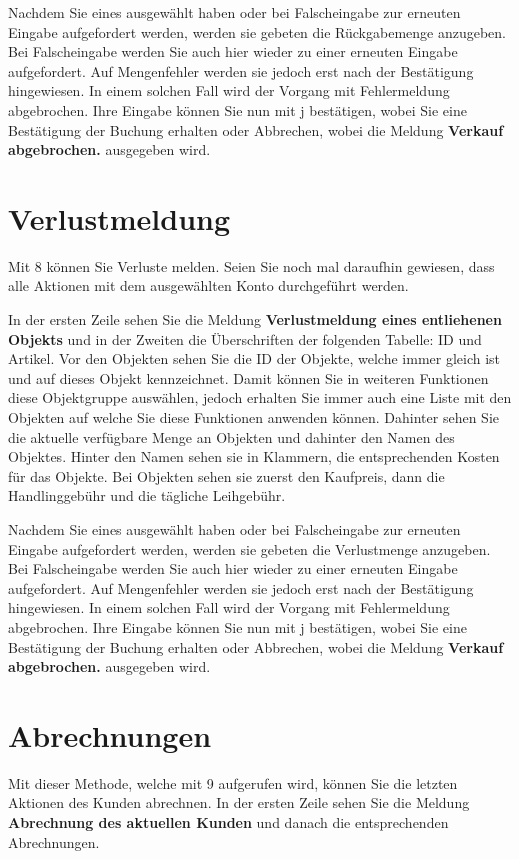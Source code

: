 ﻿\documentclass[a4paper,12pt,titlepage]{article}
\newcommand\enquote[1]{{\ttfamily \bfseries #1}}
\begin{document}
Nachdem Sie eines ausgewählt  haben oder bei Falscheingabe zur erneuten Eingabe aufgefordert werden,
 werden sie gebeten die Rückgabemenge anzugeben.
Bei Falscheingabe werden Sie auch hier wieder zu einer erneuten Eingabe aufgefordert.
Auf Mengenfehler werden sie jedoch erst nach der Bestätigung hingewiesen.
In einem solchen Fall wird der Vorgang mit Fehlermeldung abgebrochen.
Ihre Eingabe können Sie nun mit j bestätigen,
 wobei Sie eine Bestätigung der Buchung erhalten oder Abbrechen,
 wobei die Meldung \enquote{Verkauf abgebrochen.} ausgegeben wird.

\section{Verlustmeldung}
Mit 8 können Sie Verluste melden.
Seien Sie noch mal daraufhin gewiesen, dass alle Aktionen mit dem ausgewählten Konto durchgeführt werden.

In der ersten Zeile sehen Sie die Meldung \enquote{Verlustmeldung eines entliehenen Objekts}
 und in der Zweiten die Überschriften der folgenden Tabelle: ID und Artikel.
Vor den Objekten sehen Sie die ID der Objekte, welche immer gleich ist und auf dieses Objekt kennzeichnet.
Damit können Sie in weiteren Funktionen diese Objektgruppe auswählen,
jedoch erhalten Sie immer auch eine Liste mit den Objekten auf welche Sie diese Funktionen anwenden können.
Dahinter sehen Sie die aktuelle verfügbare Menge an Objekten und dahinter den Namen des Objektes.
Hinter den Namen sehen sie in Klammern, die entsprechenden Kosten für das Objekte.
Bei Objekten sehen sie zuerst den Kaufpreis, dann die Handlinggebühr und die tägliche Leihgebühr.

Nachdem Sie eines ausgewählt  haben oder bei Falscheingabe zur erneuten Eingabe aufgefordert werden,
 werden sie gebeten die Verlustmenge anzugeben.
Bei Falscheingabe werden Sie auch hier wieder zu einer erneuten Eingabe aufgefordert.
Auf Mengenfehler werden sie jedoch erst nach der Bestätigung hingewiesen.
In einem solchen Fall wird der Vorgang mit Fehlermeldung abgebrochen.
Ihre Eingabe können Sie nun mit j bestätigen, wobei Sie eine Bestätigung der Buchung erhalten oder Abbrechen,
 wobei die Meldung \enquote{Verkauf abgebrochen.} ausgegeben wird.

\section{Abrechnungen}
Mit dieser Methode, welche mit 9 aufgerufen wird, können Sie die letzten Aktionen des Kunden abrechnen.
In der ersten Zeile sehen Sie die Meldung \enquote{Abrechnung des aktuellen Kunden} und danach die entsprechenden Abrechnungen.
\end{document}
